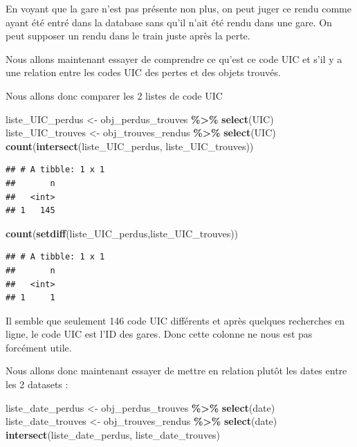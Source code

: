 \documentclass[
]{article}
\newenvironment{Shaded}{\begin{snugshade}}{\end{snugshade}}
\newcommand{\FunctionTok}[1]{\textcolor[rgb]{0.13,0.29,0.53}{\textbf{#1}}}
\newcommand{\NormalTok}[1]{#1}
\newcommand{\OtherTok}[1]{\textcolor[rgb]{0.56,0.35,0.01}{#1}}
\newcommand{\SpecialCharTok}[1]{\textcolor[rgb]{0.81,0.36,0.00}{\textbf{#1}}}
\begin{document}
En voyant que la gare n'est pas présente non plus, on peut juger ce
rendu comme ayant été entré dans la database sans qu'il n'ait été rendu
dans une gare. On peut supposer un rendu dans le train juste après la
perte.

Nous allons maintenant essayer de comprendre ce qu'est ce code UIC et
s'il y a une relation entre les codes UIC des pertes et des objets
trouvés.

Nous allons donc comparer les 2 listes de code UIC

\begin{Shaded}
\begin{Highlighting}[]
\NormalTok{liste\_UIC\_perdus }\OtherTok{\textless{}{-}}\NormalTok{ obj\_perdus\_trouves }\SpecialCharTok{\%\textgreater{}\%}
  \FunctionTok{select}\NormalTok{(UIC)}
\NormalTok{liste\_UIC\_trouves }\OtherTok{\textless{}{-}}\NormalTok{ obj\_trouves\_rendus }\SpecialCharTok{\%\textgreater{}\%}
  \FunctionTok{select}\NormalTok{(UIC)}
\FunctionTok{count}\NormalTok{(}\FunctionTok{intersect}\NormalTok{(liste\_UIC\_perdus, liste\_UIC\_trouves))}
\end{Highlighting}
\end{Shaded}

\begin{verbatim}
## # A tibble: 1 x 1
##       n
##   <int>
## 1   145
\end{verbatim}

\begin{Shaded}
\begin{Highlighting}[]
\FunctionTok{count}\NormalTok{(}\FunctionTok{setdiff}\NormalTok{(liste\_UIC\_perdus,liste\_UIC\_trouves))}
\end{Highlighting}
\end{Shaded}

\begin{verbatim}
## # A tibble: 1 x 1
##       n
##   <int>
## 1     1
\end{verbatim}

Il semble que seulement 146 code UIC différents et après quelques
recherches en ligne, le code UIC est l'ID des gares. Donc cette colonne
ne nous est pas forcément utile.

Nous allons donc maintenant essayer de mettre en relation plutôt les
dates entre les 2 datasets :

\begin{Shaded}
\begin{Highlighting}[]
\NormalTok{liste\_date\_perdus }\OtherTok{\textless{}{-}}\NormalTok{ obj\_perdus\_trouves }\SpecialCharTok{\%\textgreater{}\%}
  \FunctionTok{select}\NormalTok{(date)}
\NormalTok{liste\_date\_trouves }\OtherTok{\textless{}{-}}\NormalTok{ obj\_trouves\_rendus }\SpecialCharTok{\%\textgreater{}\%}
  \FunctionTok{select}\NormalTok{(date)}
\FunctionTok{intersect}\NormalTok{(liste\_date\_perdus, liste\_date\_trouves)}
\end{Highlighting}
\end{Shaded}
\end{document}
